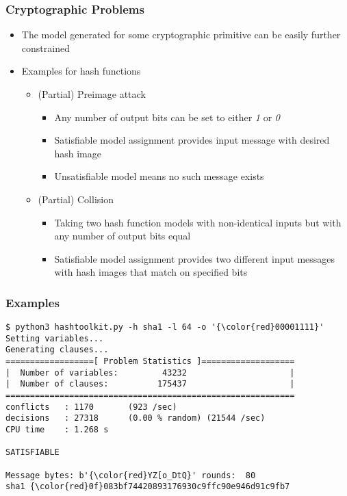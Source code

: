 \documentclass{beamer}
\begin{document}
\begin{frame}
\frametitle{Cryptographic Problems}
\begin{itemize}
\item The model generated for some cryptographic primitive can be easily further constrained
\item Examples for hash functions
\begin{itemize}
\item (Partial) Preimage attack
\begin{itemize}
\item Any number of output bits can be set to either \textit{1} or \textit{0}
\item Satisfiable model assignment provides input message with desired hash image
\item Unsatisfiable model means no such message exists
\end{itemize}
\item (Partial) Collision
\begin{itemize}
\item Taking two hash function models with non-identical inputs but with any number of output bits equal
\item Satisfiable model assignment provides two different input messages with hash images that match on specified bits
\end{itemize}
\end{itemize}
\end{itemize}
\end{frame}

\begin{frame}[fragile]
\frametitle{Examples}
\begin{Verbatim}[commandchars=\\\{\}]
$ python3 hashtoolkit.py -h sha1 -l 64 -o '{\color{red}00001111}'
Setting variables...
Generating clauses...
==================[ Problem Statistics ]===================
|  Number of variables:         43232                     |
|  Number of clauses:          175437                     |
===========================================================
conflicts   : 1170       (923 /sec)
decisions   : 27318      (0.00 % random) (21544 /sec)
CPU time    : 1.268 s

SATISFIABLE

Message bytes: b'{\color{red}YZ[o_DtQ}' rounds:  80
sha1 {\color{red}0f}083bf74420893176930c9ffc90e946d91c9fb7
\end{Verbatim}
\end{frame}
\end{document}
